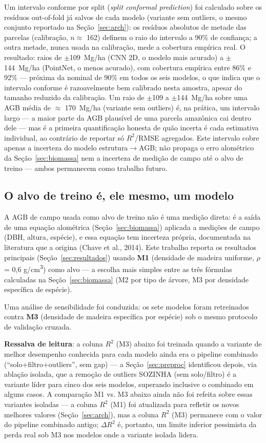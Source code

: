 Um intervalo conforme por split (\textit{split conformal prediction}) foi
calculado sobre os resíduos out-of-fold já salvos de cada modelo (variante sem
outliers, o mesmo conjunto reportado na Seção~\ref{sec:arch}): os resíduos
absolutos de metade das parcelas (calibração, $n \approx$ 162) definem o raio do
intervalo a 90\% de confiança; a outra metade, nunca usada na calibração, mede a
cobertura empírica real. O resultado: raios de $\pm$109~Mg/ha (CNN 2D, o modelo
mais acurado) a $\pm$144~Mg/ha (PointNet, o menos acurado), com cobertura empírica
entre 86\% e 92\% --- próxima da nominal de 90\% em todos os seis modelos, o que
indica que o intervalo conforme é razoavelmente bem calibrado nesta amostra,
apesar do tamanho reduzido da calibração. Um raio de $\pm$109 a $\pm$144~Mg/ha
sobre uma AGB média de $\approx$ 170~Mg/ha (variante sem outliers) é, na prática,
um intervalo largo --- a maior parte da AGB plausível de uma parcela amazônica cai
dentro dele --- mas é a primeira quantificação honesta de quão incerta é cada
estimativa individual, ao contrário de reportar só $R^2$/RMSE agregados. Este
intervalo cobre apenas a incerteza do modelo estrutura$\rightarrow$AGB; não propaga
o erro alométrico da Seção~\ref{sec:biomassa} nem a incerteza de medição de campo
até o alvo de treino --- ambos permanecem como trabalho futuro.

\subsection{O alvo de treino é, ele mesmo, um modelo}
\label{sec:allom-sens}

A AGB de campo usada como alvo de treino não é uma medição direta: é a saída de
uma equação alométrica (Seção~\ref{sec:biomassa}) aplicada a medições de campo
(DBH, altura, espécie), e essa equação tem incerteza própria, documentada na
literatura que a origina (Chave et al., 2014). Este trabalho reporta os resultados
principais (Seção~\ref{sec:resultados}) usando \textbf{M1} (densidade de madeira
uniforme, $\rho$ = 0,6 g/cm\textsuperscript{3}) como alvo --- a escolha mais
simples entre as três fórmulas calculadas na Seção~\ref{sec:biomassa} (M2 por tipo
de árvore, M3 por densidade específica de espécie).

Uma análise de sensibilidade foi conduzida: os sete modelos foram retreinados
contra \textbf{M3} (densidade de madeira específica por espécie) sob o mesmo
protocolo de validação cruzada.

\textbf{Ressalva de leitura}: a coluna $R^2$ (M3) abaixo foi treinada quando a
variante de melhor desempenho conhecida para cada modelo ainda era o pipeline
combinado (``solo+filtro+outliers'', sem gap) --- a Seção~\ref{sec:preproc}
identificou depois, via ablação isolada, que a remoção de outliers SOZINHA (sem
solo/filtro) é a variante líder para cinco dos seis modelos, superando inclusive o
combinado em alguns casos. A comparação M1 vs. M3 abaixo ainda não foi refeita
sobre essas variantes isoladas --- a coluna $R^2$ (M1) foi atualizada para
refletir os novos melhores valores (Seção~\ref{sec:arch}), mas a coluna $R^2$ (M3)
permanece com o valor do pipeline combinado antigo; $\Delta R^2$ é, portanto, um
limite inferior pessimista da perda real sob M3 nos modelos onde a variante
isolada lidera.

